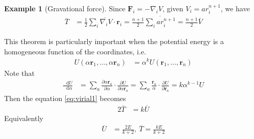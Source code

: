 \documentclass[twoside,9pt]{article}
\numberwithin{equation}{section} %
\newcommand{\lms}{\fontfamily{lmss}\selectfont} %
\renewcommand*\d{\mathop{}\!\mathrm{d}}
\theoremstyle{definition}
\newtheorem{example}{\lms Example}[section]
\theoremstyle{remark}
\begin{document}
\begin{example}[Gravational force]
Since $\mathbf{F}_i =-\nabla_i V$, 
given $V_i=ar_i^{n+1}$, we have
\begin{align}
    \overline{T} &= 
    \frac{1}{2}\overline{\sum_i\nabla_i V\cdot\mathbf{r}_i}
    = \frac{n+1}{2}\overline{\sum_i a r_i^{n+1}}
    = \frac{n+1}{2}\overline{V}
\end{align}
\end{example}

This theorem is particularly important when the potential energy is a homogeneous
function of the coordinates, i.e.
\begin{align}
    U(\alpha\mathbf{r}_1, \dots, \alpha\mathbf{r}_n) &=
    \alpha^k
    U(\mathbf{r}_1, \dots, \mathbf{r}_n)
\end{align}
Note that
\begin{align}
    \frac{\d U}{\d \alpha}
    &= 
    \sum_a \frac{\partial \alpha \mathbf{r}_a}{\partial \alpha}\cdot\frac{\partial U}{\partial \alpha\mathbf{r}_a}
    = 
    \sum_a \frac{\mathbf{r}_a}{\alpha} \cdot\frac{\partial U}{\partial \mathbf{r}_a}
    = k\alpha^{k-1} U
\end{align}
Then the equation \ref{eq:virial1} becomes
\begin{align}
    2\overline{T} &= k\overline{U}
\end{align}
Equivalently
\begin{align}
    \overline{U} &= \frac{2E}{k + 2},~
    \overline{T}  = \frac{kE}{k + 2}
\end{align}
\end{document}
